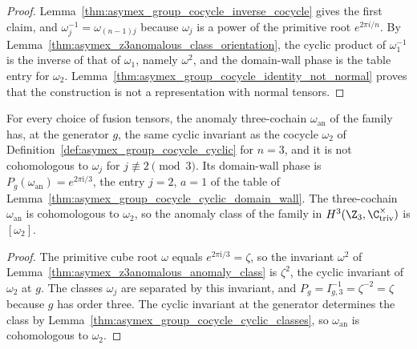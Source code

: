 \begin{proof}
    \leanok
    Lemma~\ref{thm:asymex_group_cocycle_inverse_cocycle} gives the first
    claim, and $\omega_j^{-1}=\omega_{(n-1)j}$ because $\omega_j$ is a power
    of the primitive root $e^{2\pi i/n}$. By
    Lemma~\ref{thm:asymex_z3anomalous_class_orientation}, the cyclic
    product of $\omega_1^{-1}$ is the inverse of that of $\omega_1$, namely
    $\omega^2$, and the domain-wall phase is the table entry for $\omega_2$.
    Lemma~\ref{thm:asymex_group_cocycle_identity_not_normal} proves that
    the construction is not a representation with normal tensors.
\end{proof}

\begin{corollary}
    \label{cor:asymex_z3anomalous_domain_wall}
    \leanok
    For every choice of fusion tensors, the anomaly three-cochain
    $\omega_{\mathrm{an}}$ of the family has, at the generator $g$, the same
    cyclic invariant as the cocycle $\omega_2$ of
    Definition~\ref{def:asymex_group_cocycle_cyclic} for $n=3$, and it is not
    cohomologous to $\omega_j$ for $j\not\equiv2\pmod3$. Its domain-wall phase
    is $P_g(\omega_{\mathrm{an}})=e^{2\pi\mathrm{i}/3}$, the entry $j=2$,
    $a=1$ of the table of
    Lemma~\ref{thm:asymex_group_cocycle_cyclic_domain_wall}. The
    three-cochain $\omega_{\mathrm{an}}$ is cohomologous to $\omega_2$, so the
    anomaly class of the family in $H^3(\Z_3,\C^\times_{\mathrm{triv}})$ is
    $[\omega_2]$.
\end{corollary}

\begin{proof}
    \leanok
    The primitive cube root $\omega$ equals $e^{2\pi\mathrm{i}/3}=\zeta$, so
    the invariant $\omega^2$ of
    Lemma~\ref{thm:asymex_z3anomalous_anomaly_class} is $\zeta^2$, the
    cyclic invariant of $\omega_2$ at $g$. The classes $\omega_j$ are
    separated by this invariant, and $P_g=I_{g,3}^{-1}=\zeta^{-2}=\zeta$
    because $g$ has order three. The cyclic invariant at the generator
    determines the class by
    Lemma~\ref{thm:asymex_group_cocycle_cyclic_classes}, so
    $\omega_{\mathrm{an}}$ is cohomologous to $\omega_2$.
\end{proof}

